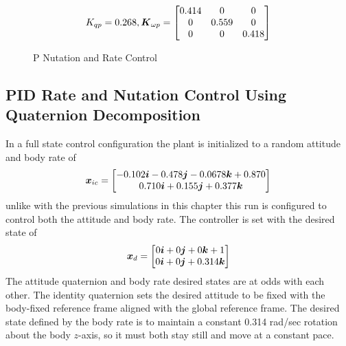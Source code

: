 \begin{equation}
  K_{qp} = 0.268, \boldsymbol{K}_{\omega p} = \begin{bmatrix} 0.414 & 0 & 0 \\ 0 & 0.559 & 0 \\ 0 & 0 & 0.418 \end{bmatrix}
\end{equation}

\begin{figure}[H]
  \centerline{}
  \caption{P Nutation and Rate Control}
  \label{fig:PNutationRateControl}
\end{figure}

\subsection{PID Rate and Nutation Control Using Quaternion Decomposition}
\label{subsec:PIDRateandNutationControl}
In a full state control configuration the plant is initialized to a random attitude and body rate of
\begin{equation}
  \boldsymbol{x}_{ic} = \begin{bmatrix} -0.102 \boldsymbol{i} -0.478 \boldsymbol{j}-0.0678 \boldsymbol{k} + 0.870 \\ 0.710 \boldsymbol{i} + 0.155 \boldsymbol{j} + 0.377 \boldsymbol{k} \end{bmatrix}
\end{equation}
unlike with the previous simulations in this chapter this run is configured to control both the attitude and body rate.  The controller is set with the desired state of
\begin{equation}
  \boldsymbol{x}_d = \begin{bmatrix} 0 \boldsymbol{i} +0 \boldsymbol{j} +0 \boldsymbol{k} + 1 \\ 0 \boldsymbol{i} + 0 \boldsymbol{j} + 0.314 \boldsymbol{k} \end{bmatrix}
\end{equation}
The attitude quaternion and body rate desired states are at odds with each other.  The identity quaternion sets the desired attitude to be fixed with the body-fixed reference frame aligned with the global reference frame.  The desired state defined by the body rate is to maintain a constant 0.314 rad/sec rotation about the body $z$-axis, so it must both stay still and move at a constant pace.

